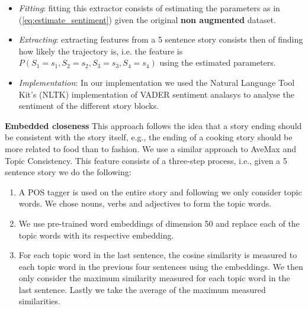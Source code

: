 \documentclass{article}
\begin{document}
\begin{itemize}
	\item \textit{Fitting}: fitting this extractor consists of estimating the parameters as in (\ref{eq:estimate_sentiment}) given the original \textbf{non augmented} dataset.
	\item \textit{Extracting}: extracting features from a 5 sentence story consists then of finding how likely the trajectory is, i.e. the feature is $P(S_1 = s_1, S_2=s_2, S_3=s_3, S_4=s_4)$ using the estimated parameters.
	\item \textit{Implementation}: In our implementation we used the Natural Language Tool Kit's (NLTK) implementation of VADER sentiment analasys \cite{VADER} to analyse the sentiment of the different story blocks.
\end{itemize}

\textbf{Embedded closeness} This approach follows the idea that a story ending
should be consistent with the story itself, e.g., the ending of a cooking story
should be more related to food than to fashion. We use a similar approach to
AveMax\cite{LSTMClassifier} and Topic Consistency\cite{COGCOMP}. This feature
consists of a three-step process, i.e., given a 5 sentence story we do the
following:

\begin{enumerate}

        \item A POS tagger is used on the entire story and following
            \cite{COGCOMP} we only consider topic words. We chose nouns,
            verbs and adjectives to form the topic words.

        \item We use pre-trained word embeddings of dimension 50 and replace
            each of the topic words with its respective embedding.

        \item For each topic word in the last sentence, the cosine similarity is
            measured to each topic word in the previous four sentences using
            the embeddings. We then only consider the maximum similarity
            measured for each topic word in the last sentence. Lastly we take
            the average of the maximum measured similarities.

\end{enumerate}
\end{document}
